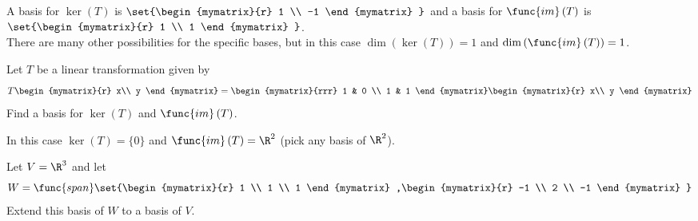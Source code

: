 \begin{enumialphparenastyle}
\begin{ex}
\begin{sol}
A basis for $\ker \left( T\right)$ is 
$\set{\begin{mymatrix}{r}
1 \\ 
-1 
\end{mymatrix} }$ 
and a basis for $\func{im} \left( T\right)$ is 
$\set{\begin{mymatrix}{r}
1 \\ 
1 
\end{mymatrix} }$. \\
There are many other possibilities for the specific bases, but in this case 
$\dim \left( \ker \left( T\right) \right)=1 $ and $\dim \left( \func{im} \left( T\right) \right)=1$.
\end{sol}

\end{ex}


\begin{ex}
 Let $T$ be a linear transformation given by 
\[
T \begin{mymatrix}{r}
x\\
y
\end{mymatrix} = \begin{mymatrix}{rrr}
1 & 0  \\
1 & 1
\end{mymatrix}
\begin{mymatrix}{r}
x\\
y
\end{mymatrix}
\]
Find a basis for $\ker \left( T\right)$ and $\func{im}
\left( T\right) $.

\begin{sol}
In this case $\ker \left( T\right) =\{0\}$ 
and $\func{im} \left( T\right) = \R^2$ (pick any basis of $\R^2$). 
\end{sol}

\end{ex}



\begin{ex}
Let $V=\R^{3}$ and let 
\begin{equation*}
W=\func{span}\set{\begin{mymatrix}{r}
1 \\ 
1 \\ 
1
\end{mymatrix} ,\begin{mymatrix}{r}
-1 \\ 
2 \\ 
-1
\end{mymatrix} }
\end{equation*}
Extend this basis of $W$ to a basis of $V$.


\end{ex}
\end{enumialphparenastyle}
